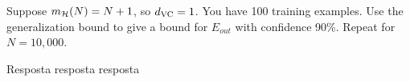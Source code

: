 \begin{enunciado}{11}
    Suppose $m_{\mathcal{H}}(N) = N + 1$, so $d_{\text{VC}} = 1$. You have 100 training examples. Use the generalization bound to give a bound for $E_{out}$ with confidence 90\%. Repeat for $N = 10,000$.
\end{enunciado}

Resposta resposta resposta